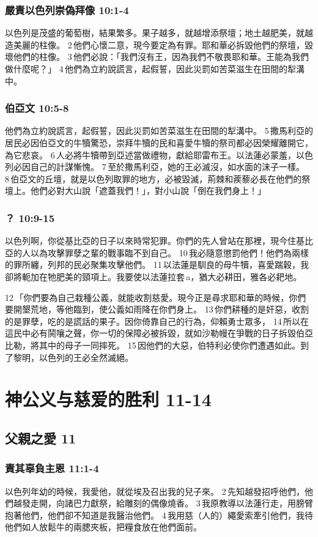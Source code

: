 \subsubsection{嚴責以色列崇偽拜像 10:1-4}
以色列是茂盛的葡萄樹，結果繁多。果子越多，就越增添祭壇；地土越肥美，就越造美麗的柱像。 2 他們心懷二意，現今要定為有罪。耶和華必拆毀他們的祭壇，毀壞他們的柱像。 3 他們必說：「我們沒有王，因為我們不敬畏耶和華。王能為我們做什麼呢？」
4 他們為立約說謊言，起假誓，因此災罰如苦菜滋生在田間的犁溝中。

\subsubsection{伯亞文 10:5-8 }
他們為立約說謊言，起假誓，因此災罰如苦菜滋生在田間的犁溝中。 5 撒馬利亞的居民必因伯亞文的牛犢驚恐，崇拜牛犢的民和喜愛牛犢的祭司都必因榮耀離開它，為它悲哀。 6 人必將牛犢帶到亞述當做禮物，獻給耶雷布王。以法蓮必蒙羞，以色列必因自己的計謀慚愧。 7 至於撒馬利亞，她的王必滅沒，如水面的沫子一樣。 8 伯亞文的丘壇，就是以色列取罪的地方，必被毀滅，荊棘和蒺藜必長在他們的祭壇上。他們必對大山說「遮蓋我們！」，對小山說「倒在我們身上！」

\subsubsection{ ？ 10:9-15}
以色列啊，你從基比亞的日子以來時常犯罪。你們的先人曾站在那裡，現今住基比亞的人以為攻擊罪孽之輩的戰事臨不到自己。 10 我必隨意懲罰他們！他們為兩樣的罪所纏，列邦的民必聚集攻擊他們。 11 以法蓮是馴良的母牛犢，喜愛踹穀，我卻將軛加在牠肥美的頸項上。我要使以法蓮拉套 a，猶大必耕田，雅各必耙地。

12 「你們要為自己栽種公義，就能收割慈愛。現今正是尋求耶和華的時候，你們要開墾荒地，等他臨到，使公義如雨降在你們身上。 13 你們耕種的是奸惡，收割的是罪孽，吃的是謊話的果子。因你倚靠自己的行為，仰賴勇士眾多， 14 所以在這民中必有鬨嚷之聲，你一切的保障必被拆毀，就如沙勒幔在爭戰的日子拆毀伯亞比勒，將其中的母子一同摔死。 15 因他們的大惡，伯特利必使你們遭遇如此。到了黎明，以色列的王必全然滅絕。

\section{神公义与慈爱的胜利 11-14}
\subsection{父親之愛 11}
\subsubsection{責其辜負主恩 11:1-4}
以色列年幼的時候，我愛他，就從埃及召出我的兒子來。 2 先知越發招呼他們，他們越發走開，向諸巴力獻祭，給雕刻的偶像燒香。 3 我原教導以法蓮行走，用膀臂抱著他們，他們卻不知道是我醫治他們。 4 我用慈（人的）繩愛索牽引他們，我待他們如人放鬆牛的兩腮夾板，把糧食放在他們面前。

